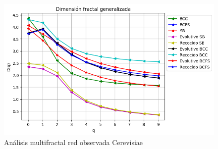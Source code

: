 \begin{figure}[H]
        \centering
        \includegraphics[scale=0.5]{CapituloAAnexos/imagenesAnexoC/Fractalidad/grafica_Dq20180508_182332cerevisiae.png}
        \caption{Análisis multifractal red observada Cerevisiae}
\end{figure}


